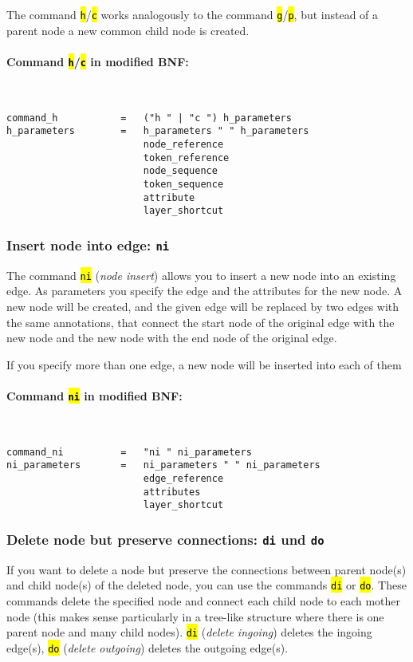 \documentclass[12pt]{scrartcl}
\newcommand{\code}[1]{\hl{\texttt{#1}}}
\begin{document}
The command \code{h}/\code{c} works analogously to the command \code{g}/\code{p}, but instead of a parent node a new common child node is created.

\paragraph*{Command \code{h}/\code{c} in modified BNF:}
~
\begin{lstlisting}
command_h           =   ("h " | "c ") h_parameters
h_parameters        =   h_parameters " " h_parameters
                        node_reference
                        token_reference
                        node_sequence
                        token_sequence
                        attribute
                        layer_shortcut
\end{lstlisting}


\subsubsection{Insert node into edge: \texttt{ni}}

The command \code{ni} (\textit{node insert}) allows you to insert a new node into an existing edge.
As parameters you specify the edge and the attributes for the new node.
A new node will be created, and the given edge will be replaced by two edges with the same annotations, that connect the start node of the original edge with the new node and the new node with the end node of the original edge.

If you specify more than one edge, a new node will be inserted into each of them

\paragraph*{Command \code{ni} in modified BNF:}
~
\begin{lstlisting}
command_ni          =   "ni " ni_parameters
ni_parameters       =   ni_parameters " " ni_parameters
                        edge_reference
                        attributes
                        layer_shortcut
\end{lstlisting}


\subsubsection{Delete node but preserve connections: \texttt{di} und \texttt{do}}

If you want to delete a node but preserve the connections between parent node(s) and child node(s) of the deleted node, you can use the commands \code{di} or \code{do}.
These commands delete the specified node and connect each child node to each mother node (this makes sense particularly in a tree-like structure where there is one parent node and many child nodes).
\code{di} (\textit{delete ingoing}) deletes the ingoing edge(s), \code{do} (\textit{delete outgoing}) deletes the outgoing edge(s).
\end{document}
